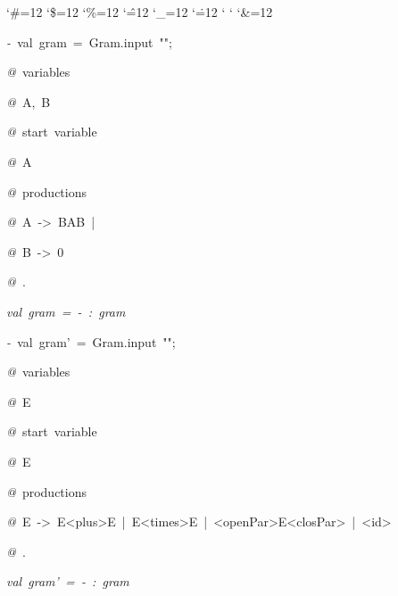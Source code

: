 \begin{list}{}
{\setlength{\leftmargin}{\leftmargini}
\setlength{\rightmargin}{0cm}
\setlength{\itemindent}{0cm}
\setlength{\listparindent}{0cm}
\setlength{\itemsep}{0cm}
\setlength{\parsep}{0cm}
\setlength{\labelsep}{0cm}
\setlength{\labelwidth}{0cm}
\catcode`\#=12
\catcode`\$=12
\catcode`\%=12
\catcode`\^=12
\catcode`\_=12
\catcode`\.=12
\catcode`
\catcode`
\catcode`\&=12
\ttfamily}
\small
\item[]\textsl{-\ }val\ gram\ =\ Gram.input\ "";
\item[]\textsl{@\ }variables
\item[]\textsl{@\ }A,\ B
\item[]\textsl{@\ }start\ variable
\item[]\textsl{@\ }A
\item[]\textsl{@\ }productions
\item[]\textsl{@\ }A\ ->\ BAB\ |\ %
\item[]\textsl{@\ }B\ ->\ 0
\item[]\textsl{@\ }.
\item[]\textsl{val\ gram\ =\ -\ :\ gram}
\item[]\textsl{-\ }val\ gram'\ =\ Gram.input\ "";
\item[]\textsl{@\ }variables
\item[]\textsl{@\ }E
\item[]\textsl{@\ }start\ variable
\item[]\textsl{@\ }E
\item[]\textsl{@\ }productions
\item[]\textsl{@\ }E\ ->\ E<plus>E\ |\ E<times>E\ |\ <openPar>E<closPar>\ |\ <id>
\item[]\textsl{@\ }.
\item[]\textsl{val\ gram'\ =\ -\ :\ gram}
\end{list}
